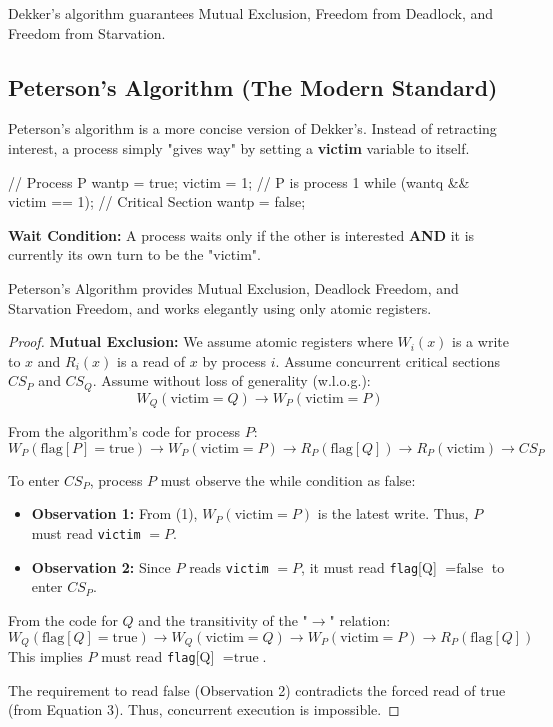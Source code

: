 \begin{theorem}
    Dekker's algorithm guarantees Mutual Exclusion, Freedom from Deadlock, and Freedom from Starvation.
\end{theorem}

\subsection{Peterson's Algorithm (The Modern Standard)}
Peterson's algorithm is a more concise version of Dekker's. Instead of retracting interest, a process simply "gives way" by setting a \textbf{victim} variable to itself.

\begin{codeexample}
// Process P
wantp = true;
victim = 1; // P is process 1
while (wantq && victim == 1);
// Critical Section
wantp = false;
\end{codeexample}

\begin{important}
    \textbf{Wait Condition:} A process waits only if the other is interested \textbf{AND} it is currently its own turn to be the "victim".
\end{important}

\begin{theorem}
    Peterson's Algorithm provides Mutual Exclusion, Deadlock Freedom, and Starvation Freedom, and works elegantly using only atomic registers.
\end{theorem}

\begin{proof}
    \textbf{Mutual Exclusion:} We assume atomic registers where $W_i(x)$ is a write to $x$ and $R_i(x)$ is a read of $x$ by process $i$.
    Assume concurrent critical sections $CS_P$ and $CS_Q$. Assume without loss of generality (w.l.o.g.):
    $$W_Q(\text{victim} = Q) \rightarrow W_P(\text{victim} = P)$$

    From the algorithm's code for process $P$:
    $$W_P(\text{flag}[P]=\text{true}) \rightarrow W_P(\text{victim}=P) \rightarrow R_P(\text{flag}[Q]) \rightarrow R_P(\text{victim}) \rightarrow CS_P$$

    To enter $CS_P$, process $P$ must observe the while condition as false:
    \begin{itemize}
        \item \textbf{Observation 1:} From (1), $W_P(\text{victim}=P)$ is the latest write. Thus, $P$ must read \texttt{victim} $= P$.
        \item \textbf{Observation 2:} Since $P$ reads \texttt{victim} $= P$, it must read \texttt{flag}[Q] $= \text{false}$ to enter $CS_P$.
    \end{itemize}
    From the code for $Q$ and the transitivity of the "$\rightarrow$" relation:
    $$W_Q(\text{flag}[Q]=\text{true}) \rightarrow W_Q(\text{victim}=Q) \rightarrow W_P(\text{victim}=P) \rightarrow R_P(\text{flag}[Q])$$ 
    This implies $P$ must read \texttt{flag}[Q] $= \text{true}$. 

    The requirement to read false (Observation 2) contradicts the forced read of true (from Equation 3). Thus, concurrent execution is impossible.
\end{proof}

